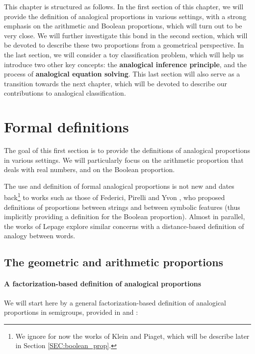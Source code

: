 This chapter is structured as follows. In the first section of this chapter, we
will provide the definition of analogical proportions in various settings, with
a strong emphasis on the arithmetic and Boolean proportions, which will turn
out to be very close. We will further investigate this bond in the second
section, which will be devoted to describe these two proportions from a
geometrical perspective. In the last section, we will consider a toy
classification problem, which will help us introduce two other key concepts:
the \textbf{analogical inference principle}, and the process of
\textbf{analogical equation solving}. This last section will also serve as a
transition towards the next chapter, which will be devoted to describe our
contributions to analogical classification.

\section{Formal definitions}
\label{SEC:formal_definitions_proportions}

The goal of this first section is to provide the definitions of analogical
proportions in various settings. We will particularly focus on the arithmetic
proportion that deals with real numbers, and on the Boolean proportion.

The use and definition of formal analogical proportions is not new and dates
back\footnote{We ignore for now the works of Klein and Piaget, which will be
describe later in Section \ref{SEC:boolean_prop}.} to works such as those of
Federici, Pirelli and Yvon \cite{FedPirYvo95, PirYvo99}, who proposed
definitions of proportions between strings and between symbolic features (thus
implicitly providing a definition for the Boolean proportion).  Almost in
parallel, the works of Lepage \cite{LepShi96, Lep98} explore similar concerns
with a distance-based definition of analogy between words.

\subsection{The geometric and arithmetic proportions}

\paragraph{A factorization-based definition of analogical proportions\\}

We will start here by a general factorization-based definition of analogical
proportions in semigroups, provided in \cite{StrYvoCNLL05} and
\cite{StrYvoREPORT05}:

